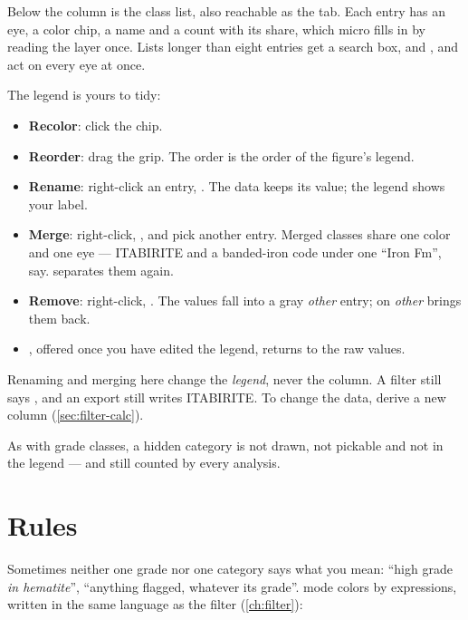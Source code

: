 Below the column is the class list, also reachable as the  tab. Each entry has an eye, a color chip, a name and a count with its share, which micro fills in by reading the layer once. Lists longer than eight entries get a search box, and ,  and  act on every eye at once.

The legend is yours to tidy:

\begin{itemize}
\item \textbf{Recolor}: click the chip.
\item \textbf{Reorder}: drag the  grip. The order is the order of the figure's legend.
\item \textbf{Rename}: right-click an entry, . The data keeps its value; the legend shows your label.
\item \textbf{Merge}: right-click, , and pick another entry. Merged classes share one color and one eye — ITABIRITE and a banded-iron code under one “Iron Fm”, say.  separates them again.
\item \textbf{Remove}: right-click, . The values fall into a gray \emph{other} entry;  on \emph{other} brings them back.
\item {}, offered once you have edited the legend, returns to the raw values.
\end{itemize}

\begin{note}
Renaming and merging here change the \emph{legend}, never the column. A filter still says , and an export still writes ITABIRITE. To change the data, derive a new column (\cref{sec:filter-calc}).
\end{note}

As with grade classes, a hidden category is not drawn, not pickable and not in the legend — and still counted by every analysis.


\section{Rules}\label{sec:color-rules}
Sometimes neither one grade nor one category says what you mean: “high grade \emph{in hematite}”, “anything flagged, whatever its grade”.  mode colors by expressions, written in the same language as the filter (\cref{ch:filter}):

